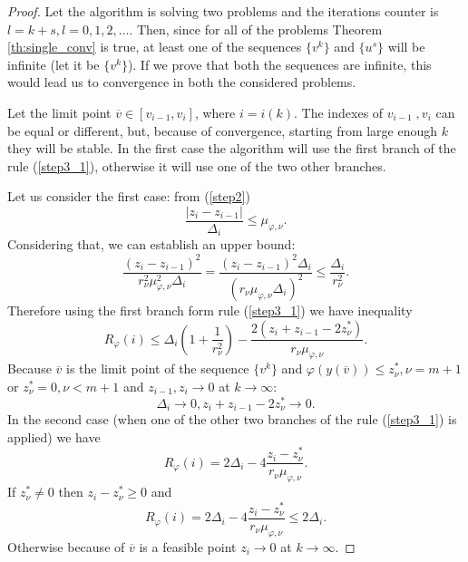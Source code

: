 \documentclass[runningheads]{llncs}
\begin{document}
\begin{proof}
  Let the algorithm is solving two problems and the iterations counter is \(l = k + s, l=0,1,2,\dots\).
  Then, since for all of the problems Theorem \ref{th:single_conv} is true, at least one of the sequences
  \(\{v^k\}\) and \(\{u^s\}\) will be infinite (let it be \(\{v^k\}\)). If we prove that both the
  sequences are infinite, this would lead us to convergence in both the considered problems.

  Let the limit point \(\overline{v}\in [v_{i-1},v_i]\), where \(i=i(k)\). The indexes of \(v_{i-1}\;,v_i\)
  can be equal or different, but, because of convergence, starting from large enough \(k\) they will be stable.
  In the first case the algorithm will use the first branch of the rule (\ref{step3_1}), otherwise it will use
  one of the two other branches.

  Let us consider the first case: from (\ref{step2})
  \begin{displaymath}
    \frac{|z_i-z_{i-1}|}{\Delta_i} \leqslant \mu_{\varphi,\nu}.
  \end{displaymath}
  Considering that, we can establish an upper bound:
  \begin{displaymath}
    \frac{(z_i-z_{i-1})^2}{r_\nu^2\mu_{\varphi,\nu}^2\Delta_i}=\frac{(z_i-z_{i-1})^2\Delta_i}{(r_\nu\mu_{\varphi,\nu}\Delta_i)^2}
    \leqslant \frac{\Delta_i}{r_\nu^2}.
  \end{displaymath}
  Therefore using the first branch form rule (\ref{step3_1}) we have inequality
  \begin{equation}
    \label{eq:th1}
    R_\varphi(i)\leqslant\Delta_i(1 + \frac{1}{r_\nu^2}) - \frac{2(z_i+z_{i-1}-2z^*_\nu)}{r_\nu\mu_{\varphi,\nu}}.
  \end{equation}
  Because \(\overline{v}\) is the limit point of the sequence \(\{v^k\}\) and \(\varphi(y(\overline{v}))\leqslant z^*_{\nu}, \nu=m+1\) or
  \(z^*_\nu=0, \nu<m+1\) and \(z_{i-1},z_i\to 0\) at \(k\to\infty\):
  \begin{equation}
    \label{eq:th2}
    \Delta_i\to 0, z_i+z_{i-1} - 2 z_\nu^*\to 0.
  \end{equation}
  In the second case (when one of the other two branches of the rule (\ref{step3_1}) is applied) we have
  \begin{displaymath}
    R_\varphi(i)=2\Delta_i - 4\frac{z_i-z^*_\nu}{r_\nu\mu_{\varphi,\nu}}.
  \end{displaymath}
  If \(z^*_\nu \ne 0\) then \(z_i-z^*_\nu \geqslant 0\) and
  \begin{equation}
    \label{eq:th3}
    R_\varphi(i)=2\Delta_i - 4\frac{z_i-z^*_\nu}{r_\nu\mu_{\varphi,\nu}} \leqslant 2\Delta_i.
  \end{equation}
  Otherwise because of \(\overline{v}\) is a feasible point \(z_i\to 0\) at \(k\to\infty\).


\end{proof}
\end{document}
